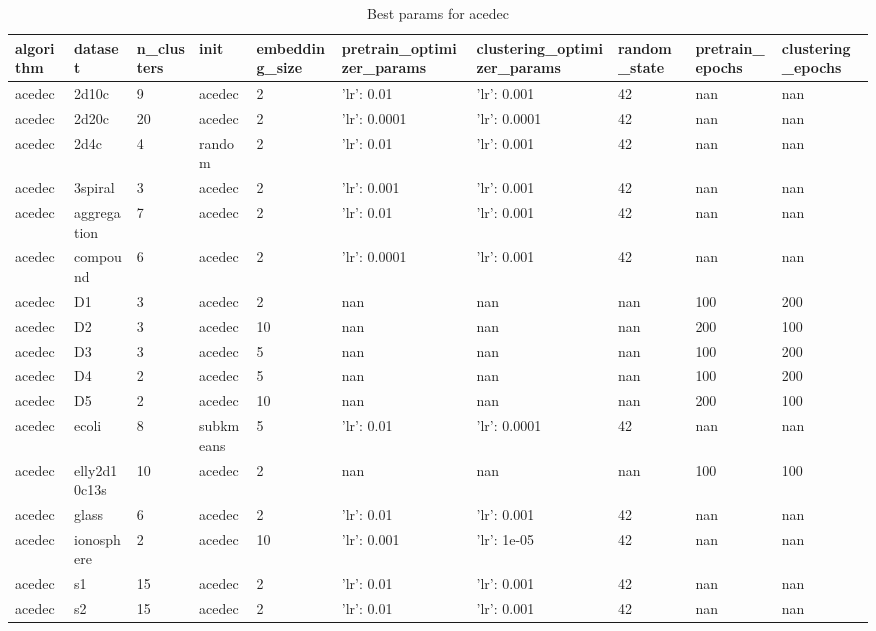 
\begin{table}[H]
\centering
\caption{Best params for acedec}
\label{S1_Table}
\begin{tabular}{|l|l|l|l|l|l|l|l|l|l|}
\hline
algorithm & dataset & n\_clusters & init & embedding\_size & pretrain\_optimizer\_params & clustering\_optimizer\_params & random\_state & pretrain\_epochs & clustering\_epochs \\
\hline
acedec & 2d10c & 9 & acedec & 2 & {'lr': 0.01} & {'lr': 0.001} & 42 & nan & nan \\
\hline
acedec & 2d20c & 20 & acedec & 2 & {'lr': 0.0001} & {'lr': 0.0001} & 42 & nan & nan \\
\hline
acedec & 2d4c & 4 & random & 2 & {'lr': 0.01} & {'lr': 0.001} & 42 & nan & nan \\
\hline
acedec & 3spiral & 3 & acedec & 2 & {'lr': 0.001} & {'lr': 0.001} & 42 & nan & nan \\
\hline
acedec & aggregation & 7 & acedec & 2 & {'lr': 0.01} & {'lr': 0.001} & 42 & nan & nan \\
\hline
acedec & compound & 6 & acedec & 2 & {'lr': 0.0001} & {'lr': 0.001} & 42 & nan & nan \\
\hline
acedec & D1 & 3 & acedec & 2 & nan & nan & nan & 100 & 200 \\
\hline
acedec & D2 & 3 & acedec & 10 & nan & nan & nan & 200 & 100 \\
\hline
acedec & D3 & 3 & acedec & 5 & nan & nan & nan & 100 & 200 \\
\hline
acedec & D4 & 2 & acedec & 5 & nan & nan & nan & 100 & 200 \\
\hline
acedec & D5 & 2 & acedec & 10 & nan & nan & nan & 200 & 100 \\
\hline
acedec & ecoli & 8 & subkmeans & 5 & {'lr': 0.01} & {'lr': 0.0001} & 42 & nan & nan \\
\hline
acedec & elly2d10c13s & 10 & acedec & 2 & nan & nan & nan & 100 & 100 \\
\hline
acedec & glass & 6 & acedec & 2 & {'lr': 0.01} & {'lr': 0.001} & 42 & nan & nan \\
\hline
acedec & ionosphere & 2 & acedec & 10 & {'lr': 0.001} & {'lr': 1e-05} & 42 & nan & nan \\
\hline
acedec & s1 & 15 & acedec & 2 & {'lr': 0.01} & {'lr': 0.001} & 42 & nan & nan \\
\hline
acedec & s2 & 15 & acedec & 2 & {'lr': 0.01} & {'lr': 0.001} & 42 & nan & nan \\

\end{tabular}
\end{table}
